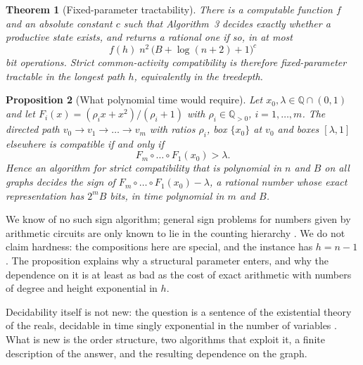 \documentclass[11pt,a4paper]{article}
\theoremstyle{plain}
\newtheorem{theorem}{Theorem}[section]
\newtheorem{proposition}[theorem]{Proposition}
\theoremstyle{definition}
\theoremstyle{remark}
\newcommand{\Q}{\mathbb{Q}}
\begin{document}
\begin{theorem}[Fixed-parameter tractability]\label{thm:fpt}
There is a computable function $f$ and an absolute constant $c$ such that Algorithm~3 decides exactly whether a productive state exists, and returns a rational one if so, in at most
\[
   f(h)\;n^{2}\,\bigl(B+\log(n+2)+1\bigr)^{c}
\]
bit operations. Strict common-activity compatibility is therefore fixed-parameter tractable in the longest path $h$, equivalently in the treedepth.
\end{theorem}

\begin{proposition}[What polynomial time would require]\label{prop:barrier}
Let $x_0,\lambda\in\Q\cap(0,1)$ and let $F_i(x)=(\rho_ix+x^2)/(\rho_i+1)$ with $\rho_i\in\Q_{>0}$, $i=1,\dots,m$. The directed path $v_0\to v_1\to\dots\to v_m$ with ratios $\rho_i$, box $\{x_0\}$ at $v_0$ and boxes $[\lambda,1]$ elsewhere is compatible if and only if
\[
   F_m\circ\dots\circ F_1(x_0)>\lambda .
\]
Hence an algorithm for strict compatibility that is polynomial in $n$ and $B$ on all graphs decides the sign of $F_m\circ\dots\circ F_1(x_0)-\lambda$, a rational number whose exact representation has $2^mB$ bits, in time polynomial in $m$ and $B$.
\end{proposition}

We know of no such sign algorithm; general sign problems for numbers given by arithmetic circuits are only known to lie in the counting hierarchy \citep{allender2009}. We do not claim hardness: the compositions here are special, and the instance has $h=n-1$. The proposition explains why a structural parameter enters, and why the dependence on it is at least as bad as the cost of exact arithmetic with numbers of degree and height exponential in $h$.

Decidability itself is not new: the question is a sentence of the existential theory of the reals, decidable \citep{tarski1951,collins1975} in time singly exponential in the number of variables \citep{grigoriev1988,renegar1992,bpr2006}. What is new is the order structure, two algorithms that exploit it, a finite description of the answer, and the resulting dependence on the graph.
\end{document}
